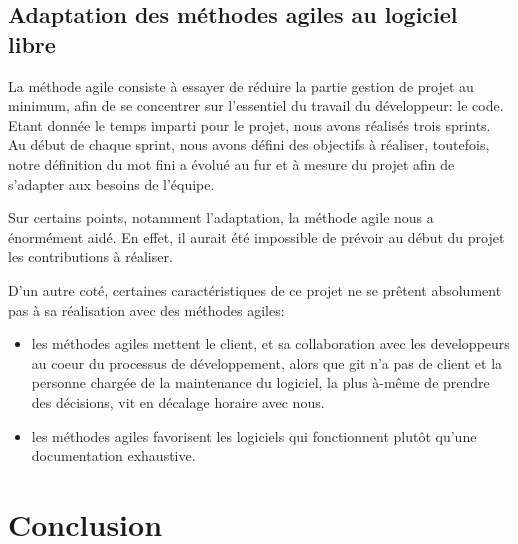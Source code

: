 \documentclass[a4paper, 12pt]{article}
\begin{document}
\subsection{Adaptation des méthodes agiles au logiciel libre}

La méthode agile consiste à essayer de réduire la partie gestion de projet au minimum, afin de se concentrer sur l'essentiel du travail du développeur: le code.
Etant donnée le temps imparti pour le projet, nous avons réalisés trois sprints.
Au début de chaque sprint, nous avons défini des objectifs à réaliser, toutefois, notre définition du mot fini a évolué au fur et à mesure du projet afin de s'adapter aux besoins de l'équipe.

Sur certains points, notamment l'adaptation, la méthode agile nous a énormément aidé. En effet, il aurait été impossible de prévoir au début du projet les contributions à réaliser. 

D'un autre coté, certaines caractéristiques de ce projet ne se prêtent absolument pas à sa réalisation avec des méthodes agiles: 
\begin{itemize}
\item les méthodes agiles mettent le client, et sa collaboration avec les developpeurs au coeur du processus de développement, alors que git n'a pas de client et la personne chargée de la maintenance du logiciel, la plus à-même de prendre des décisions, vit en décalage horaire avec nous. 
\item les méthodes agiles favorisent les logiciels qui fonctionnent plutôt qu'une documentation exhaustive. 
\end{itemize}


\section{Conclusion}
\end{document}
